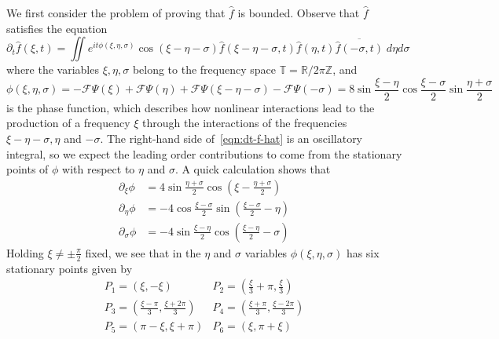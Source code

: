 \documentclass[letterpaper, reqno,final]{amsart}
\newcommand{\bbZ}{\mathbb{Z}}
\newcommand{\bbR}{\mathbb{R}}
\newcommand{\bbT}{\mathbb{T}}
\newcommand{\fhPi}{\frac{\pi}{2}}
\newcommand{\discrAvg}{\Psi}
\begin{document}
We first consider the problem of proving that $\hat{f}$ is bounded.  Observe that $\hat{f}$ satisfies the equation
\begin{equation}\label{eqn:dt-f-hat}
    \partial_t \hat{f}(\xi,t) = \iint e^{it\phi(\xi,\eta,\sigma)}\cos(\xi - \eta - \sigma) {\hat f(\xi-\eta-\sigma,t)}\hat f(\eta, t) \overline{\hat f(-\sigma, t)}\;d\eta d\sigma
\end{equation}
where the variables $\xi, \eta, \sigma$ belong to the frequency space $\bbT = \bbR / 2\pi\bbZ$, and
\begin{equation}
    \phi(\xi,\eta,\sigma) = -\mathcal{F}\discrAvg(\xi) + \mathcal{F}\discrAvg(\eta) + \mathcal{F}\discrAvg(\xi - \eta - \sigma) - \mathcal{F}\discrAvg(-\sigma) = 8\sin \frac{\xi - \eta}{2} \cos \frac{\xi - \sigma}{2} \sin\frac{\eta + \sigma}{2}
\end{equation}
is the phase function, which describes how nonlinear interactions lead to the production of a frequency $\xi$ through the interactions of the frequencies $\xi-\eta-\sigma, \eta$ and $-\sigma$. The right-hand side of~\eqref{eqn:dt-f-hat} is an oscillatory integral, so we expect the leading order contributions to come from the stationary points of $\phi$ with respect to $\eta$ and $\sigma$.   A quick calculation shows that
\begin{equation}\label{eqn:phi-derivs}\begin{split}
    \partial_\xi \phi &=  4\sin \frac{\eta + \sigma}{2} \cos\left( \xi - \frac{\eta + \sigma}{2}\right)\\
    \partial_\eta \phi &= -4\cos\frac{\xi - \sigma}{2} \sin \left(\frac{\xi - \sigma}{2} - \eta\right)\\
    \partial_\sigma \phi &= -4 \sin \frac{\xi - \eta}{2} \cos\left(\frac{\xi - \eta}{2} - \sigma\right)
\end{split}\end{equation}
Holding $\xi \neq \pm \fhPi$ fixed, we see that in the $\eta$ and $\sigma$ variables $\phi(\xi,\eta,\sigma)$ has six stationary points given by
\begin{equation*}
\begin{array}{ll}
    P_1 = \left(\xi, -\xi\right) & P_2 = \left(\frac{\xi}{3} + \pi, \frac{\xi}{3}\right)\\
    P_3 = \left(\frac{\xi - \pi}{3}, \frac{\xi + 2\pi}{3}\right) & P_4 = \left(\frac{\xi + \pi}{3}, \frac{\xi - 2\pi}{3}\right)\\
    P_5 = \left(\pi-\xi, \xi + \pi\right) & P_6 = \left(\xi, \pi + \xi \right)
\end{array}
\end{equation*}
\end{document}
